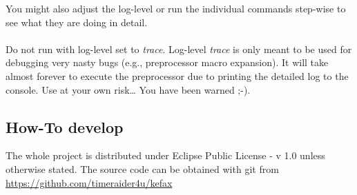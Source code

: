 You might also adjust the log-level or run the individual commands step-wise to see what they are doing in detail.
\\ \ \\
\warning{} Do not run with log-level set to {\it trace}. 
Log-level {\it trace} is only meant to be used for debugging very nasty bugs 
(e.g., preprocessor macro expansion).
It will take almost forever to execute the preprocessor due to printing the detailed log to the console.
Use at your own risk\dots{} You have been warned ;-).

\FloatBarrier

\subsection{How-To develop}
The whole project is distributed under Eclipse Public License - v 1.0 
\cite{EPL_URL} unless otherwise stated.
The source code can be obtained  with git from \url{https://github.com/timeraider4u/kefax}\cite{Kefax2_URL}
